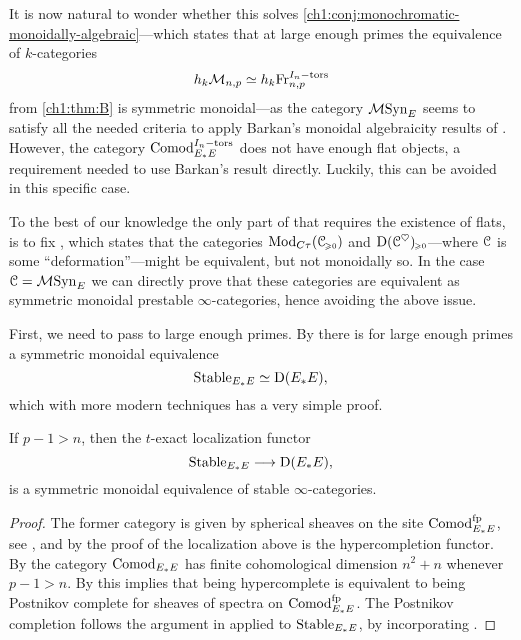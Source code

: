It is now natural to wonder whether this solves \cref{ch1:conj:monochromatic-monoidally-algebraic}---which states that at large enough primes the equivalence of $k$-categories 
\[h_k\mathcal{M}_{n,p} \simeq h_k\mathrm{Fr}_{n,p}^{I_n-\mathrm{tors}}\] 
from \cref{ch1:thm:B} is symmetric monoidal---as the category $\mathcal{M}\mathrm{Syn}_{E}$ seems to satisfy all the needed criteria to apply Barkan's monoidal algebraicity results of \cite{barkan_2023}. However, the category $\mathrm{Comod}_{E_*E}^{I_n-\mathrm{tors}}$ does not have enough flat objects, a requirement needed to use Barkan's result directly. Luckily, this can be avoided in this specific case. 

To the best of our knowledge the only part of \cite[Theorem H]{barkan_2023} that requires the existence of flats, is to fix \cite[Warning 3.30]{barkan_2023}, which states that the categories $\mathrm{Mod}_{C\tau}(\EuScript{C}_{\hspace{-1pt}\scriptscriptstyle\geqslant 0})$ and $\mathrm{D}(\EuScript{C}^\heartsuit)_{\hspace{-1pt}\scriptscriptstyle\geqslant 0}$---where $\EuScript{C}$ is some ``deformation''---might be equivalent, but not monoidally so. In the case $\EuScript{C}= \mathcal{M}\mathrm{Syn}_{E}$ we can directly prove that these categories are equivalent as symmetric monoidal prestable $\infty$-categories, hence avoiding the above issue. 

First, we need to pass to large enough primes. By \cite[4.11]{barthel-heard_2018} there is for large enough primes a symmetric monoidal equivalence
\[\mathrm{Stable}_{E_*E} \simeq \mathrm{D}(E_*E),\]
which with more modern techniques has a very simple proof. 

\begin{lemma}
    \label{ch3:add:cor:hypercomplete-at-large-primes}
    If $p-1>n$, then the $t$-exact localization functor
    \[\mathrm{Stable}_{E_*E} \longrightarrow \mathrm{D}(E_*E),\]
    is a symmetric monoidal equivalence of stable $\infty$-categories.  
\end{lemma}
\begin{proof}
    The former category is given by spherical sheaves on the site $\mathrm{Comod}_{E_*E}^{\mathrm{fp}}$, see \cite[3.7]{pstragowski_2022}, and by the proof of \cite[4.54]{pstragowski_2022} the localization above is the hypercompletion functor. By \cite[2.5]{pstragowski_2021} the category $\mathrm{Comod}_{E_*E}$ has finite cohomological dimension $n^2+n$ whenever $p-1>n$. By \cite[2.10]{clausen-mathew_2021} this implies that being hypercomplete is equivalent to being Postnikov complete for sheaves of spectra on $\mathrm{Comod}_{E_*E}^{\mathrm{fp}}$. The Postnikov completion follows the argument in \cite[7.4, 7.5]{pstragowski_vankoughnett_2022} applied to $\mathrm{Stable}_{E_*E}$, by incorporating \cite[6.10]{hovey_04}. 
\end{proof}


